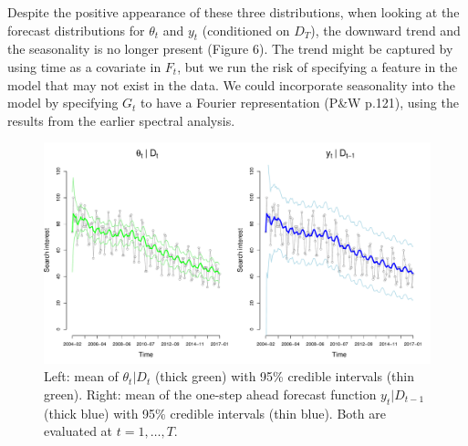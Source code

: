 \documentclass[12pt]{article}
\begin{document}
\noindent Despite the positive appearance of these three distributions, when looking at the forecast distributions for $\theta_t$ and $y_t$ (conditioned on $D_T$), the downward trend and the seasonality is no longer present (Figure 6). The trend might be captured by using time as a covariate in $F_t$, but we run the risk of specifying a feature in the model that may not exist in the data. We could incorporate seasonality into the model by specifying $G_t$ to have a Fourier representation (P\&W p.121), using the results from the earlier spectral analysis.

\begin{figure}[H]
\begin{center}
\includegraphics[scale=0.36]{figs/current.pdf}
\end{center}
\caption{Left: mean of $\theta_t|D_t$ (thick green) with 95\% credible intervals (thin green). Right: mean of the one-step ahead forecast function $y_t|D_{t-1}$ (thick blue) with 95\% credible intervals (thin blue). Both are evaluated at $t=1,\ldots,T$.}
\end{figure}
\end{document}
